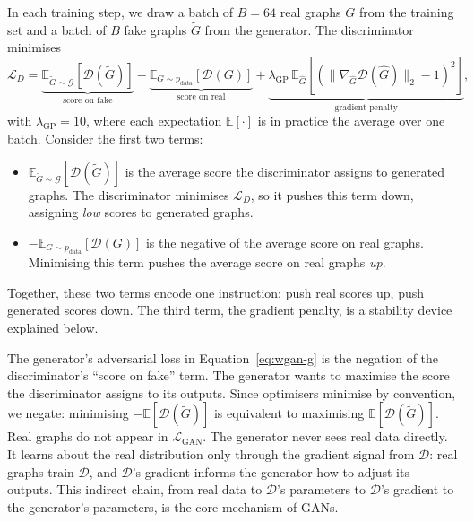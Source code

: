 \documentclass[12pt,a4paper]{article}
\begin{document}
In each training step, we draw a batch of $B = 64$ real graphs $G$ from the training set and a batch of $B$ fake graphs $\tilde{G}$ from the generator. The discriminator minimises
\begin{equation}
  \mathcal{L}_D = \underbrace{\mathbb{E}_{\tilde{G} \sim \mathcal{G}}[\mathcal{D}(\tilde{G})]}_{\text{score on fake}} - \underbrace{\mathbb{E}_{G \sim p_{\text{data}}}[\mathcal{D}(G)]}_{\text{score on real}} + \underbrace{\lambda_{\text{GP}} \, \mathbb{E}_{\hat{G}}\!\left[(\|\nabla_{\hat{G}} \mathcal{D}(\hat{G})\|_2 - 1)^2\right]}_{\text{gradient penalty}},
  \label{eq:wgan-d}
\end{equation}
with $\lambda_{\text{GP}} = 10$, where each expectation $\mathbb{E}[\cdot]$ is in practice the average over one batch. Consider the first two terms:

\begin{itemize}[nosep]
  \item $\mathbb{E}_{\tilde{G} \sim \mathcal{G}}[\mathcal{D}(\tilde{G})]$ is the average score the discriminator assigns to generated graphs. The discriminator minimises $\mathcal{L}_D$, so it pushes this term down, assigning \emph{low} scores to generated graphs.
  \item $-\mathbb{E}_{G \sim p_{\text{data}}}[\mathcal{D}(G)]$ is the negative of the average score on real graphs. Minimising this term pushes the average score on real graphs \emph{up}.
\end{itemize}

Together, these two terms encode one instruction: push real scores up, push generated scores down. The third term, the gradient penalty, is a stability device explained below.

The generator's adversarial loss in Equation~\eqref{eq:wgan-g} is the negation of the discriminator's ``score on fake'' term. The generator wants to maximise the score the discriminator assigns to its outputs. Since optimisers minimise by convention, we negate: minimising $-\mathbb{E}[\mathcal{D}(\tilde{G})]$ is equivalent to maximising $\mathbb{E}[\mathcal{D}(\tilde{G})]$. Real graphs do not appear in $\mathcal{L}_{\text{GAN}}$. The generator never sees real data directly. It learns about the real distribution only through the gradient signal from $\mathcal{D}$: real graphs train $\mathcal{D}$, and $\mathcal{D}$'s gradient informs the generator how to adjust its outputs. This indirect chain, from real data to $\mathcal{D}$'s parameters to $\mathcal{D}$'s gradient to the generator's parameters, is the core mechanism of GANs.
\end{document}
